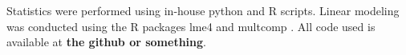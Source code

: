 \documentclass[10pt]{article}
\begin{document}
Statistics were performed using in-house python and R scripts. Linear modeling was conducted using the R packages lme4 \citep{Bates2012} and
multcomp \citep{Hothorn2008}. All code used is available at \textbf{the github or something}.



\end{document}
